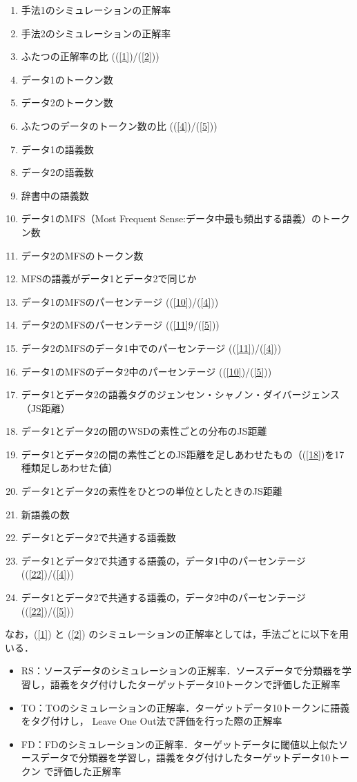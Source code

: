 \documentclass[japanese]{jnlp_1.4}
\begin{document}
\begin{enumerate}
\item 手法1のシミュレーションの正解率 \label{1}
\item 手法2のシミュレーションの正解率 \label{2}
\item ふたつの正解率の比 ((\ref{1})/(\ref{2}))
\item データ1のトークン数 \label{4}
\item データ2のトークン数  \label{5}
\item ふたつのデータのトークン数の比 ((\ref{4})/(\ref{5}))
\item データ1の語義数 \label{7}
\item データ2の語義数 \label{8}
\item 辞書中の語義数 
\item データ1のMFS（Most Frequent Sense:データ中最も頻出する語義）のトークン数 \label{10}
\item データ2のMFSのトークン数 \label{11}
\item MFSの語義がデータ1とデータ2で同じか \label{12}
\item データ1のMFSのパーセンテージ ((\ref{10})/(\ref{4})) \label{13}
\item データ2のMFSのパーセンテージ ((\ref{11}9/(\ref{5})) \label{14}
\item データ2のMFSのデータ1中でのパーセンテージ ((\ref{11})/(\ref{4})) \label{15}
\item データ1のMFSのデータ2中のパーセンテージ ((\ref{10})/(\ref{5})) \label{16}
\item データ1とデータ2の語義タグのジェンセン・シャノン・ダイバージェンス（JS距離） \label{17}
\item データ1とデータ2の間のWSDの素性ごとの分布のJS距離 \label{18}
\item データ1とデータ2の間の素性ごとのJS距離を足しあわせたもの（(\ref{18})を17種類足しあわせた値） \label{19}
\item データ1とデータ2の素性をひとつの単位としたときのJS距離 \label{20}
\item 新語義の数 \label{21}
\item データ1とデータ2で共通する語義数 \label{22}
\item データ1とデータ2で共通する語義の，データ1中のパーセンテージ ((\ref{22})/(\ref{4})) \label{23}
\item データ1とデータ2で共通する語義の，データ2中のパーセンテージ ((\ref{22})/(\ref{5})) \label{24}
\end{enumerate}

なお，(\ref{1}) と (\ref{2}) のシミュレーションの正解率としては，手法ごとに以下を用いる．
\begin{itemize}
\item RS：ソースデータのシミュレーションの正解率．ソースデータで分類器を学習し，語義をタグ付けしたターゲットデータ10トークンで評価した正解率
\item TO：TOのシミュレーションの正解率．ターゲットデータ10トークンに語義をタグ付けし，
Leave One Out法で評価を行った際の正解率
\item FD：FDのシミュレーションの正解率．ターゲットデータに閾値以上似たソースデータで分類器を学習し，語義をタグ付けしたターゲットデータ10トークン
で評価した正解率
\end{itemize}
\end{document}
